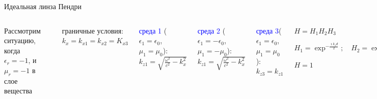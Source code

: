 \documentclass[9pt, compress, xcolor=table]{beamer}
\begin{document}
\begin{frame}{Идеальная линза Пендри}

\begin{columns}[c]
\column{6cm}

Рассмотрим ситуацию, когда $\epsilon_r = -1$, и $\mu_r = -1$ в слое вещества
\begin{center}
\includegraphics[width=4cm]{neg_ref_40a}
\end{center}

\column{6cm} граничные условия: $k_x = k_{x1}= k_{x2} = K_{x3}$

\textcolor{blue}{среда 1} ($\epsilon_1 = \epsilon_0$, $\mu_1 = \mu_0$): $k_{z1} =
\sqrt{\frac{\omega^2}{c^2}-k_{x}^2}$

\textcolor{blue}{среда 2} ($\epsilon_1 = -\epsilon_0$, $\mu_1 = -\mu_0$): $k_{z1} =
\sqrt{\frac{\omega^2}{c^2}-k_{x}^2}$

\textcolor{blue}{среда 3}($\epsilon_1 = \epsilon_0$, $\mu_1 = \mu_0$): $k_{z3} = k_{z1}$
\begin{center}
$H=H_1H_2H_3$

$H_1= \exp^{-\frac{\imath k_z d}{2}};\quad H_2= \exp^{\imath k_z d};\quad H_3= \exp^{-\frac{\imath
k_z d}{2}}$

$H=1$
\end{center}

\end{columns}
\end{frame}
\end{document}
